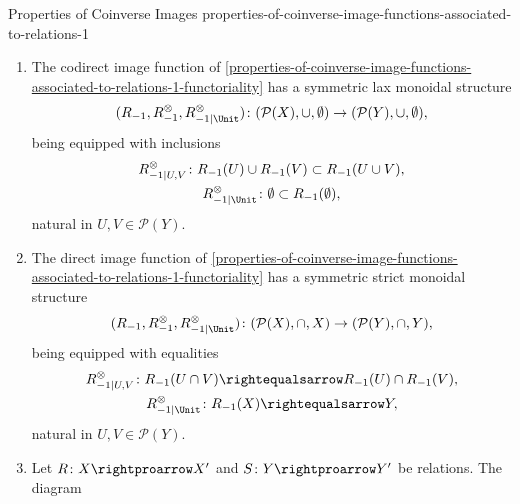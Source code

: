 \begin{proposition}{Properties of Coinverse Images \rmI}{properties-of-coinverse-image-functions-associated-to-relations-1}
\begin{enumerate}
\[\begin{gathered}
                \end{gathered}
            \]%
            natural in $U,V\in\mathcal{P}(Y)$.
        \item\label{properties-of-coinverse-image-functions-associated-to-relations-1-symmetric-lax-monoidality-with-respect-to-unions}The codirect image function of \cref{properties-of-coinverse-image-functions-associated-to-relations-1-functoriality} has a symmetric lax monoidal structure
            \[
                (R_{-1},R^{\otimes}_{-1},R^{\otimes}_{-1|\Unit})
                \colon
                (\mathcal{P}(X),\cup,\emptyset)
                \to
                (\mathcal{P}(Y),\cup,\emptyset),
            \]%
            being equipped with inclusions%
            \[
                \begin{gathered}
                    R^{\otimes}_{-1|U,V}   \colon R_{-1}(U)\cup R_{-1}(V) \subset R_{-1}(U\cup V),\\
                    R^{\otimes}_{-1|\Unit} \colon \emptyset               \subset R_{-1}(\emptyset),
                \end{gathered}
            \]%
            natural in $U,V\in\mathcal{P}(Y)$.
        \item\label{properties-of-coinverse-image-functions-associated-to-relations-1-symmetric-strict-monoidality-with-respect-to-intersections}The direct image function of \cref{properties-of-coinverse-image-functions-associated-to-relations-1-functoriality} has a symmetric strict monoidal structure
            \[
                (R_{-1},R^{\otimes}_{-1},R^{\otimes}_{-1|\Unit})
                \colon
                (\mathcal{P}(X),\cap,X)
                \to
                (\mathcal{P}(Y),\cap,Y),
            \]%
            being equipped with equalities%
            \[
                \begin{gathered}
                    R^{\otimes}_{-1|U,V}   \colon R_{-1}(U\cap V) \rightequalsarrow R_{-1}(U)\cap R_{-1}(V),\\
                    R^{\otimes}_{-1|\Unit} \colon R_{-1}(X)       \rightequalsarrow Y,
                \end{gathered}
            \]%
            natural in $U,V\in\mathcal{P}(Y)$.
        \item\label{properties-of-coinverse-image-functions-associated-to-relations-1-interaction-with-coproducts}Let $R\colon X\rightproarrow X'$ and $S\colon Y\rightproarrow Y'$ be relations. The diagram

\end{enumerate}
\end{proposition}
